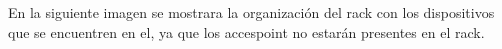 \documentclass[12pt]{article}
\begin{document}
En la siguiente imagen se mostrara la organización del rack con los dispositivos que se encuentren en el, ya que los accespoint no estarán presentes en el rack.\\\\
\begin{center}
\end{center}




\end{document}
